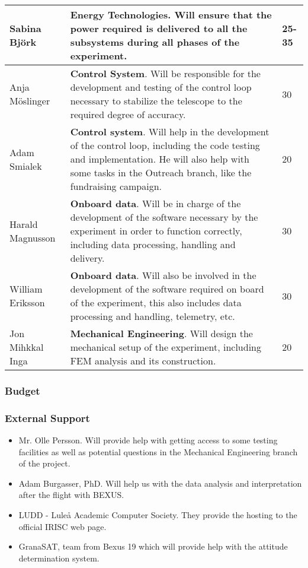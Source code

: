 \begin{longtable}{m{} | m{} | m{}}
	Sabina Bj{\"o}rk & \textbf{Energy Technologies}. Will ensure that the power required is delivered to all the subsystems during all phases of the experiment. & 25-35 \\ \hline
	Anja M{\"o}slinger & \textbf{Control System}. Will be responsible for the development and testing of the control loop necessary to stabilize the telescope to the required degree of accuracy. & 30 \\ \hline
	Adam Smialek & \textbf{Control system}.  Will help in the development of the control loop, including the code testing and implementation. He will also help with some tasks in the Outreach branch, like the fundraising campaign. & 20 \\ \hline
	Harald Magnusson & \textbf{Onboard data}. Will be in charge of the development of the software necessary by the experiment in order to function correctly, including data processing, handling and delivery. & 30 \\ \hline
	William Eriksson & \textbf{Onboard data}. Will also be involved in the development of the software required on board of the experiment, this also includes data processing and handling, telemetry, etc. & 30 \\ \hline
	Jon Mihkkal Inga & \textbf{Mechanical Engineering}. Will design the mechanical setup of the experiment, including FEM analysis and its construction. & 20 \\ \hline

\end{longtable}

\subsubsection{Budget}
\label{sec:3.2.2}





\subsubsection{External Support}

\begin{itemize}
	\item Mr. Olle Persson. Will provide help with getting access to some testing facilities as well as potential questions in the Mechanical Engineering branch of the project.
	\item Adam Burgasser, PhD. Will help us with the data analysis and interpretation after the flight with BEXUS.
	\item LUDD - Luleå Academic Computer Society. They provide the hosting to the official IRISC web page.
	\item GranaSAT, team from Bexus 19 which will provide help with the attitude determination system.
\end{itemize}
